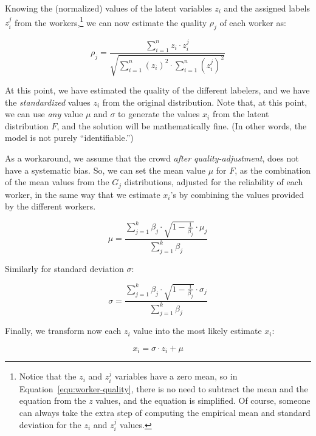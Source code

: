 \documentclass{article}
\begin{document}
Knowing the (normalized) values of the latent variables $z_i$ and the assigned labels $z_i^j$ from the workers,\footnote{Notice that the $z_i$ and $z^j_i$ variables have a zero mean, so in Equation~\ref{equ:worker-quality}, there  is no need to subtract the mean and the equation from the $z$ values, and the equation is simplified. Of course, someone can always take the extra step of computing the empirical mean and standard deviation for the $z_i$ and $z^j_i$ values.} we can now estimate the quality $\rho_j$ of each worker as:

\begin{equation}
\label{equ:worker-quality}
\rho_j = \frac{ \sum_{i=1}^n z_i \cdot z^j_i }{ \sqrt{\sum_{i=1}^n (z_i)^2 \cdot  \sum_{i=1}^n (z^j_i)^2 }}
\end{equation}

At this point, we have estimated the quality of the different labelers, and we have the \emph{standardized} values $z_i$ from the original distribution. Note that, at this point, we can use \emph{any} value $\mu$ and $\sigma$ to generate the values $x_i$ from the latent distribution $F$, and the solution will be mathematically fine. (In other words, the model is not purely ``identifiable.'') 

As a workaround, we assume that the crowd \emph{after quality-adjustment}, does not have a systematic bias. So, we can set the mean value $\mu$ for $F$, as the combination of the mean values from the $G_j$ distributions, adjusted for the reliability of each worker, in the same way that we estimate $x_i$'s by combining the values provided by the different workers.

\begin{equation}
\label{equ:mu}
\mu = \frac{ \sum_{j=1}^k \beta_j \cdot \sqrt{1-\frac{1}{\beta_j}} \cdot \mu_j } {\sum_{j=1}^k \beta_j} 
\end{equation}

\noindent Similarly for standard deviation $\sigma$:

\begin{equation}
\label{equ:sigma}
\sigma = \frac{ \sum_{j=1}^k \beta_j \cdot \sqrt{1-\frac{1}{\beta_j}} \cdot \sigma_j } {\sum_{j=1}^k \beta_j} 
\end{equation}

\noindent Finally, we transform now each $z_i$ value into the most likely estimate $x_i$:

\begin{equation}
\label{equ:xi}
x_i = \sigma \cdot z_i + \mu
\end{equation}
\end{document}
